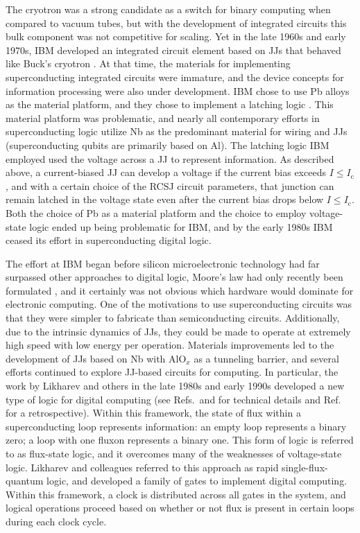 \documentclass[twocolumn]{article}
\begin{document}
The cryotron was a strong candidate as a switch for binary computing when compared to vacuum tubes, but with the development of integrated circuits this bulk component was not competitive for scaling. Yet in the late 1960s and early 1970s, IBM developed an integrated circuit element based on JJs that behaved like Buck's cryotron \cite{an1980}. At that time, the materials for implementing superconducting integrated circuits were immature, and the device concepts for information processing were also under development. IBM chose to use Pb alloys as the material platform, and they chose to implement a latching logic \cite{lise1991}. This material platform was problematic, and nearly all contemporary efforts in superconducting logic utilize Nb as the predominant material for wiring and JJs (superconducting qubits are primarily based on Al). The latching logic IBM employed used the voltage across a JJ to represent information. As described above, a current-biased JJ can develop a voltage if the current bias exceeds $I\le I_{\mathrm{c}}$, and with a certain choice of the RCSJ circuit parameters, that junction can remain latched in the voltage state even after the current bias drops below $I\le I_{\mathrm{c}}$. Both the choice of Pb as a material platform and the choice to employ voltage-state logic ended up being problematic for IBM, and by the early 1980s IBM ceased its effort in superconducting digital logic.

The effort at IBM began before silicon microelectronic technology had far surpassed other approaches to digital logic, Moore's law had only recently been formulated \cite{mo1965}, and it certainly was not obvious which hardware would dominate for electronic computing. One of the motivations to use superconducting circuits was that they were simpler to fabricate than semiconducting circuits. Additionally, due to the intrinsic dynamics of JJs, they could be made to operate at extremely high speed with low energy per operation. Materials improvements led to the development of JJs based on Nb with AlO$_{x}$ as a tunneling barrier, and several efforts continued to explore JJ-based circuits for computing. In particular, the work by Likharev and others in the late 1980s and early 1990s developed a new type of logic for digital computing (see Refs.\,\cite{lise1991} and \cite{buli2001} for technical details and Ref.\,\cite{li2012} for a retrospective). Within this framework, the state of flux within a superconducting loop represents information: an empty loop represents a binary zero; a loop with one fluxon represents a binary one. This form of logic is referred to as flux-state logic, and it overcomes many of the weaknesses of voltage-state logic. Likharev and colleagues referred to this approach as rapid single-flux-quantum logic, and developed a family of gates to implement digital computing. Within this framework, a clock is distributed across all gates in the system, and logical operations proceed based on whether or not flux is present in certain loops during each clock cycle. 
\end{document}
